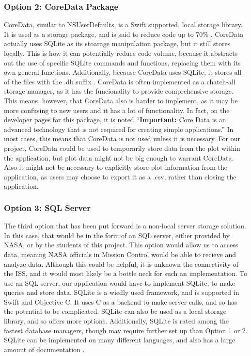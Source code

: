 \documentclass[onecolumn, draftclsnofoot,10pt, compsoc]{IEEEtran}
\begin{document}
\subsubsection{Option 2: CoreData Package}
CoreData, similar to NSUserDefaults, is a Swift supported, local storage library.
It is used as a storage package, and is said to reduce code up to 70\% \cite{coreApple}.
CoreData actually uses SQLite as its stoarage manipulation package, but it still stores locally.
This is how it can potentially reduce code volume, because it abstracts out the use of specific SQLite commands and functions, replacing them with its own general functions.
Additionally, because CoreData uses SQLite, it stores all of the files with the .db suffix \cite{storeoptions}.
CoreData is often implemented as a chatch-all storage manager, as it has the funcionality to provide comprehensive storage.
This means, however, that CoreData also is harder to implement, as it may be more confusing to new users and it has a lot of functionality.
In fact, on the developer pages for this package, it is noted ``\textbf{Important:} Core Data is an advanced technology that is not required for creating simple applications.''\cite{coreApple2}
In most cases, this means that CoreData is not used unless it is necessary.
For our project, CoreData could be used to temporarily store data from the plot within the application, but plot data might not be big enough to warrant CoreData.
Also it might not be necessary to explicitly store plot information from the application, as users may choose to export it as a .csv, rather than closing the application.

\subsubsection{Option 3: SQL Server}
The third option that has been put forward is a non-local server storage solution.
In this case, that would be in the form of an SQL server, either provided by NASA, or by the students of this project.
This option would allow us to access data, meaning NASA officials in Mission Control would be able to recieve and analyze data.
Although this could be helpful, it is unknown the connectivity of the ISS, and it would most likely be a bottle neck for such an implementation.
To use an SQL server, our application would have to implement SQLite, to make queries and store data.
SQLite is a wiedly used framework, and is supported in Swift and Objective C.
It uses C as a backend to make server calls, and so has the potential to be complicated.
SQLite can also be used as a local storage library, and so offers more options.
Additionally, SQLite is rated among the fastest database managers, though may require further set up than Option 1 or 2.
SQLite can be implemented on many different languages, and also has a large amount of documentation \cite{sqlite}.
\end{document}
